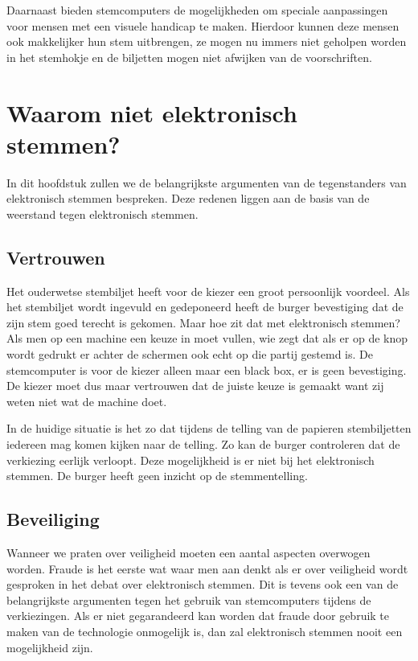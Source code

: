 \documentclass[a4paper]{article}
\begin{document}
Daarnaast bieden stemcomputers de mogelijkheden om speciale aanpassingen voor mensen met een visuele handicap te maken.
Hierdoor kunnen deze mensen ook makkelijker hun stem uitbrengen, ze mogen nu immers niet geholpen worden in het stemhokje en de biljetten mogen niet afwijken van de voorschriften.

\newpage

\section{Waarom niet elektronisch stemmen?}
In dit hoofdstuk zullen we de belangrijkste argumenten van de tegenstanders van elektronisch stemmen bespreken.
Deze redenen liggen aan de basis van de weerstand tegen elektronisch stemmen.

\subsection{Vertrouwen}
Het ouderwetse stembiljet heeft voor de kiezer een groot persoonlijk voordeel. 
Als het stembiljet wordt ingevuld en gedeponeerd heeft de burger bevestiging dat de zijn stem goed terecht is gekomen. 
Maar hoe zit dat met elektronisch stemmen?
Als men op een machine een keuze in moet vullen, wie zegt dat als er op de knop wordt gedrukt er achter de schermen ook echt op die partij gestemd is.
De stemcomputer is voor de kiezer alleen maar een black box, er is geen bevestiging.
De kiezer moet dus maar vertrouwen dat de juiste keuze is gemaakt want zij weten niet wat de machine doet.

In de huidige situatie is het zo dat tijdens de telling van de papieren stembiljetten iedereen mag komen kijken naar de telling.
Zo kan de burger controleren dat de verkiezing eerlijk verloopt.
Deze mogelijkheid is er niet bij het elektronisch stemmen.
De burger heeft geen inzicht op de stemmentelling. 

\subsection{Beveiliging}
Wanneer we praten over veiligheid moeten een aantal aspecten overwogen worden. 
Fraude is het eerste wat waar men aan denkt als er over veiligheid wordt gesproken in het debat over elektronisch stemmen.
Dit is tevens ook een van de belangrijkste argumenten tegen het gebruik van stemcomputers tijdens de verkiezingen.
Als er niet gegarandeerd kan worden dat fraude door gebruik te maken van de technologie onmogelijk is, dan zal elektronisch stemmen nooit een mogelijkheid zijn.
\end{document}
